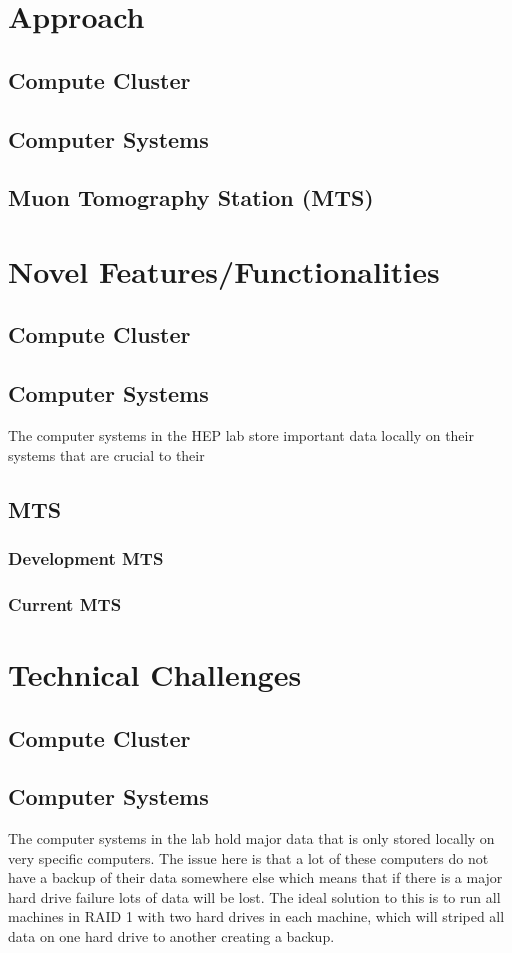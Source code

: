 \documentclass[12pt]{article}
\newcommand\tab[1][1cm]{\hspace*{#1}}
\begin{document}
\section{Approach}
\subsection{Compute Cluster}
\subsection{Computer Systems}
\subsection{Muon Tomography Station (MTS)}

\section{Novel Features/Functionalities}
\subsection{Compute Cluster}
\subsection{Computer Systems}
\tab The computer systems in the HEP lab store important data locally on their systems that are crucial to their 
\subsection{MTS}
\subsubsection{Development MTS}
\subsubsection{Current MTS}


\section{Technical Challenges}
\subsection{Compute Cluster}
\subsection{Computer Systems}
\tab The computer systems in the lab hold major data that is only stored locally on very specific computers. The issue here is that a lot of these computers do not have a backup of their data somewhere else which means that if there is a major hard drive failure lots of data will be lost. The ideal solution to this is to run all machines in RAID 1 with two hard drives in each machine, which will striped all data on one hard drive to another creating a backup. 
\end{document}
